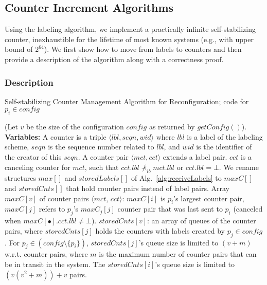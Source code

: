 \documentclass[11pt]{article}
\begin{document}
\subsection{Counter Increment Algorithms}
\label{sec:counter} 
Using the labeling algorithm, we implement a practically infinite self-stabilizing counter, inexhaustible for the lifetime of most known systems (e.g., with upper bound of $2^{64}$).
We first show how to move from labels to counters and then provide a description of the algorithm along with a correctness proof.




\subsubsection{Description}

\begin{algorithm}
\caption{{Self-stabilizing Counter Management Algorithm for Reconfiguration; code for $p_i \in config$}}
\label{alg:configCounting}


\begin{footnotesize}
(Let $v$ be the size of the configuration $config$ as returned by $getConfig()$).\\
{\bf Variables:}
A counter is a triple $\langle lbl, seqn, wid \rangle$ where $lbl$ is a label of the labeling scheme, $seqn$ is the sequence number related to $lbl$, and $wid$ is the identifier of the creator of this $seqn$. A counter pair $\langle mct, cct\rangle$ extends a label pair. $cct$ is a canceling counter for $mct$, such that $cct.lbl \not \prec_{lb} mct.lbl$ or $cct.lbl = \bot$. 
We rename structures $max[]$ and $storedLabels[]$ of Alg.~\ref{alg:receiveLabels} to  $maxC[]$ and $storedCnts[]$ that hold counter pairs instead of label pairs.
Array $maxC[v]$ of counter pairs $\langle mct$, $cct \rangle$: $maxC[i]$ is $p_i$'s largest counter pair, $maxC[j]$ refers to $p_j$'s $maxC_j[j]$ counter pair that was last sent to $p_i$ (canceled when $maxC[\bullet].cct.lbl \neq \bot$).
$storedCnts[v]$: an array of queues of the counter pairs, where $storedCnts[j]$ holds the counters with labels created by $p_j \in config$. 
For $p_j \in (config \setminus \{ p_i \})$, $storedCnts[j]$'s queue size is limited to $(v+m)$ w.r.t. counter pairs, where $m$ is the maximum number of counter pairs that can be in transit in the system. 
The $storedCnts[i]$'s queue size is limited to $(v(v^2+m))+v$ pairs.
\label{CCT:var} \\


\end{footnotesize}
\end{algorithm}
\end{document}
